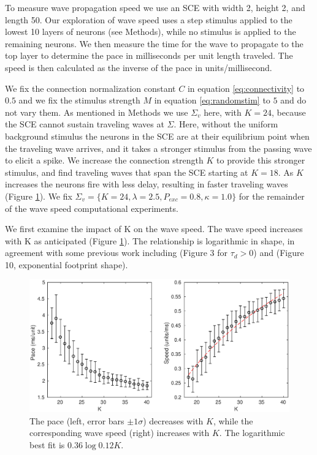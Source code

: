 \documentclass[12pt]{article}
\begin{document}
\FloatBarrier

To measure wave propagation speed we use an SCE with width 2, height 2, and length 50.
Our exploration of wave speed uses a step stimulus applied to the lowest 10 layers of neurons (see Methods), while no stimulus is applied to the remaining neurons.
We then measure the time for the wave to propagate to the top layer to determine the pace in milliseconds per unit length traveled.
The speed is then calculated as the inverse of the pace in units/millisecond.

We fix the connection normalization constant $C$ in equation \ref{eq:connectivity} to $0.5$ and we fix the stimulus strength $M$ in equation \ref{eq:randomstim} to $5$ and do not vary them.
As mentioned in Methods we use $\Sigma_v$ here, with $K=24$, because the SCE cannot sustain traveling waves at $\Sigma$. 
Here, without the uniform background stimulus the neurons in the SCE are at their equilibrium point when the traveling wave arrives, and it takes a stronger stimulus from the passing wave to elicit a spike.
We increase the connection strength $K$ to provide this stronger stimulus, and find traveling waves that span the SCE starting at $K=18$. 
As $K$ increases the neurons fire with less delay, resulting in faster traveling waves (Figure \ref{fig:delay_k}).
We fix $\Sigma_v = \{K=24,\lambda=2.5,P_{exc}=0.8,\kappa=1.0 \}$ for the remainder of the wave speed computational experiments.

We first examine the impact of K on the wave speed.
The wave speed increases with K as anticipated (Figure \ref{fig:delay_k}).
The relationship is logarithmic in shape, in agreement with some previous work including \parencite{Golomb1999} (Figure 3 for $\tau_d>0$) and \parencite{Golomb1996}(Figure 10, exponential footprint shape).

\begin{figure}[!htb]
 \caption{The pace (left, error bars $\pm 1 \sigma$) decreases with $K$, while the corresponding wave speed (right) increases with $K$. 
          The logarithmic best fit is $0.36\log{0.12K}$.}
 \label{fig:delay_k}
 \centering
   \includegraphics[width=\textwidth]{fig/WaveSpeed_K}
\end{figure}
\end{document}
